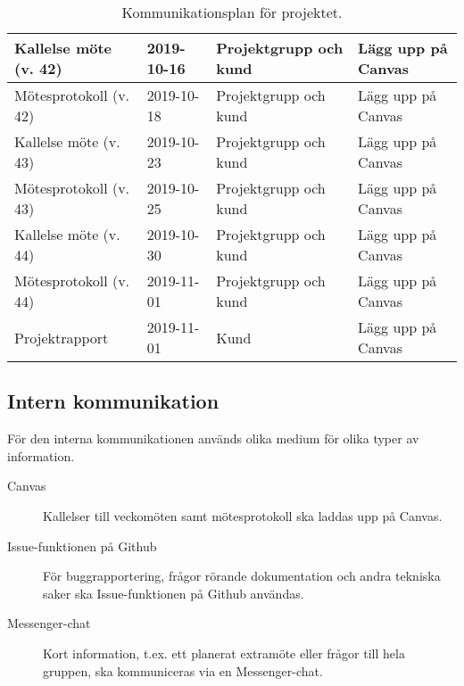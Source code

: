 \documentclass[a4paper]{article}
\begin{document}
\begin{table}[t]
\begin{tabular}{| l | l | l | l |}
Kallelse möte  (v. 42) & 2019-10-16   & Projektgrupp och kund & Lägg upp på Canvas \\ \hline
Mötesprotokoll (v. 42) & 2019-10-18   & Projektgrupp och kund & Lägg upp på Canvas \\ \hline
Kallelse möte  (v. 43) & 2019-10-23   & Projektgrupp och kund & Lägg upp på Canvas \\ \hline
Mötesprotokoll (v. 43) & 2019-10-25   & Projektgrupp och kund & Lägg upp på Canvas \\ \hline
Kallelse möte  (v. 44) & 2019-10-30   & Projektgrupp och kund & Lägg upp på Canvas \\ \hline
Mötesprotokoll (v. 44) & 2019-11-01   & Projektgrupp och kund & Lägg upp på Canvas \\ \hline
Projektrapport         & 2019-11-01   & Kund                  & Lägg upp på Canvas \\ \hline

\end{tabular}
\caption{Kommunikationsplan för projektet.}
\end{table}

\subsection*{Intern kommunikation}

För den interna kommunikationen används olika medium för olika typer av information.

\begin{description}
 \item [Canvas] Kallelser till veckomöten samt mötesprotokoll ska laddas upp på Canvas.
 \item [Issue-funktionen på Github] För buggrapportering, frågor rörande dokumentation och andra tekniska saker ska Issue-funktionen på Github användas.
 \item [Messenger-chat] Kort information, t.ex. ett planerat extramöte eller frågor till hela gruppen, ska kommuniceras via en Messenger-chat.
\end{description}
\end{document}
